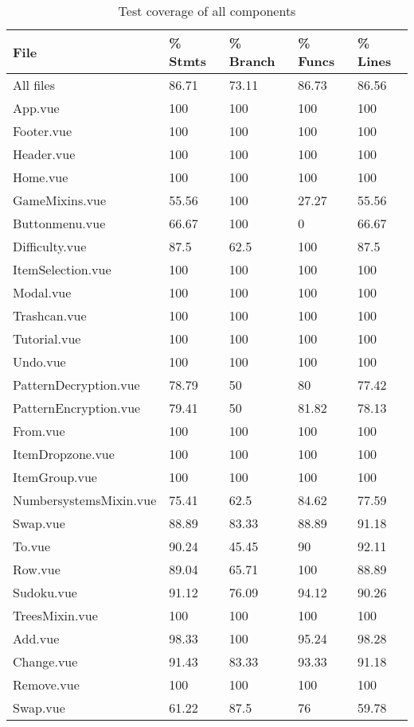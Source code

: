 \begin{table}
    \label{table:testCoverage}
    \caption{Test coverage of all components}
    \centering
    \begin{tabular}{|l|l|l|l|l|}
    \hline
        File & \% Stmts & \% Branch & \% Funcs & \% Lines \\ \hline
        All files & 86.71 & 73.11 & 86.73 & 86.56 \\ \hline
        App.vue & 100 & 100 & 100 & 100 \\ \hline
        Footer.vue & 100 & 100 & 100 & 100 \\ \hline
        Header.vue & 100 & 100 & 100 & 100 \\ \hline
        Home.vue & 100 & 100 & 100 & 100 \\ \hline
        GameMixins.vue & 55.56 & 100 & 27.27 & 55.56 \\ \hline
        Buttonmenu.vue & 66.67 & 100 & 0 & 66.67 \\ \hline
        Difficulty.vue & 87.5 & 62.5 & 100 & 87.5 \\ \hline
        ItemSelection.vue & 100 & 100 & 100 & 100 \\ \hline
        Modal.vue & 100 & 100 & 100 & 100 \\ \hline
        Trashcan.vue & 100 & 100 & 100 & 100 \\ \hline
        Tutorial.vue & 100 & 100 & 100 & 100 \\ \hline
        Undo.vue & 100 & 100 & 100 & 100 \\ \hline
        PatternDecryption.vue & 78.79 & 50 & 80 & 77.42 \\ \hline
        PatternEncryption.vue & 79.41 & 50 & 81.82 & 78.13 \\ \hline
        From.vue & 100 & 100 & 100 & 100 \\ \hline
        ItemDropzone.vue & 100 & 100 & 100 & 100 \\ \hline
        ItemGroup.vue & 100 & 100 & 100 & 100 \\ \hline
        NumbersystemsMixin.vue & 75.41 & 62.5 & 84.62 & 77.59 \\ \hline
        Swap.vue & 88.89 & 83.33 & 88.89 & 91.18 \\ \hline
        To.vue & 90.24 & 45.45 & 90 & 92.11 \\ \hline
        Row.vue & 89.04 & 65.71 & 100 & 88.89 \\ \hline
        Sudoku.vue & 91.12 & 76.09 & 94.12 & 90.26 \\ \hline
        TreesMixin.vue & 100 & 100 & 100 & 100 \\ \hline
        Add.vue & 98.33 & 100 & 95.24 & 98.28 \\ \hline
        Change.vue & 91.43 & 83.33 & 93.33 & 91.18 \\ \hline
        Remove.vue & 100 & 100 & 100 & 100 \\ \hline
        Swap.vue & 61.22 & 87.5 & 76 & 59.78 \\ \hline
    \end{tabular}
\end{table}

